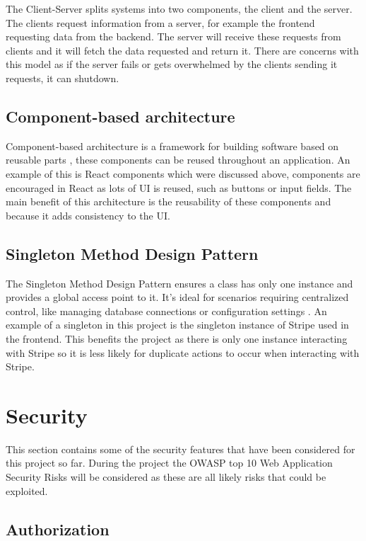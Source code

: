 \documentclass[]{project_report}
\begin{document}
The Client-Server splits systems into two components, the client and the server. The clients request information from a server, for example the frontend requesting data from the backend. The server will receive these requests from clients and it will fetch the data requested and return it. There are concerns with this model as if the server fails or gets overwhelmed by the clients sending it requests, it can shutdown.


\subsection{Component-based architecture}

Component-based architecture is a framework for building software based on reusable parts \cite{component_architecture}, these components can be reused throughout an application. An example of this is React components which were discussed above, components are encouraged in React as lots of UI is reused, such as buttons or input fields. The main benefit of this architecture is the reusability of these components and because it adds consistency to the UI.


\subsection{Singleton Method Design Pattern}

The Singleton Method Design Pattern ensures a class has only one instance and provides a global access point to it. It’s ideal for scenarios requiring centralized control, like managing database connections or configuration settings \cite{singleton}. An example of a singleton in this project is the singleton instance of Stripe used in the frontend. This benefits the project as there is only one instance interacting with Stripe so it is less likely for duplicate actions to occur when interacting with Stripe.

\section{Security}

This section contains some of the security features that have been considered for this project so far. During the project the OWASP top 10 Web Application Security Risks \cite{owasp_10} will be considered as these are all likely risks that could be exploited.

\subsection{Authorization}
\end{document}
